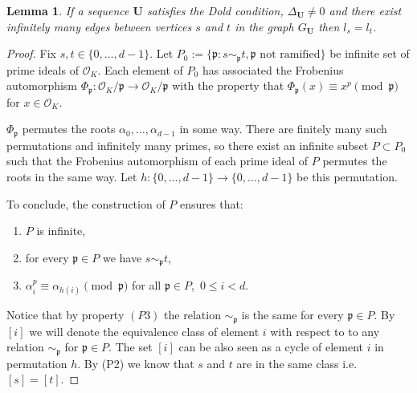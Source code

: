 \documentclass[preprint,12pt]{elsarticle}
\newcommand{\OO}{\mathcal{O}}
\newcommand{\alphas}{\alpha_0,\ldots,\alpha_{d-1}}
\newcommand{\pp}{\mathfrak{p} }
\newtheorem{lemma}{Lemma}
\begin{document}
\begin{lemma}\label{lem_infinEdge}
    If a sequence ${\mathbf U}$  satisfies the Dold condition, $\Delta_\mathbf{U} \not=0 $ and there exist infinitely many edges between vertices $s$ and $t$ in the graph $G_\mathbf{U}$ then $l_s=l_t$. 
\end{lemma}
\begin{proof}
    Fix $s, t \in \{ 0, \ldots, d-1\}$. Let $P_0 := \{\pp: s\sim_\pp t, \pp \text{ not ramified} \}$ be infinite set of prime ideals of $\OO_K$. Each element of $P_0$ has associated the Frobenius automorphism $\Phi_\pp: \OO_K/\pp \to\OO_K/\pp$ with the property that $\Phi_\pp(x) \equiv x^p\pmod{\pp}$ for $x \in \OO_K$.
    
     $\Phi_\pp$ permutes the roots $\alphas$ in some way. There are finitely many such permutations and infinitely many primes, so there exist an infinite subset $P \subset P_0$ such that the Frobenius automorphism of each prime ideal of $P$ permutes the roots in the same way. Let $h:\{0,\ldots,d-1\}\to\{0,\ldots,d-1\}$ be this permutation.

    
    To conclude, the construction of $P$ ensures that:
    \begin{enumerate}
        \item[(P1)] $P$ is infinite,
        \item[(P2)] for every $\pp\in P$ we have $s\sim_\pp t$,
        \item[(P3)] $\alpha_i^p \equiv \alpha_{h(i)} \pmod \pp $ for all $\pp\in P$,\ $0\!\leqslant\! i\!<\! d$.
    \end{enumerate}

    Notice that by property $(P3)$ the relation $\sim_\pp$ is the same for every $\pp\in P$. 
    By $[i]$ we will denote the equivalence class of element $i$ with respect to to any relation $\sim_\pp$ for $\pp\in P$. The set $[i]$ can be also seen as a cycle of element $i$ in permutation $h$. By (P2) we know that $s$ and $t$ are in the same class i.e. $[s] = [t]$.


\end{proof}
\end{document}
